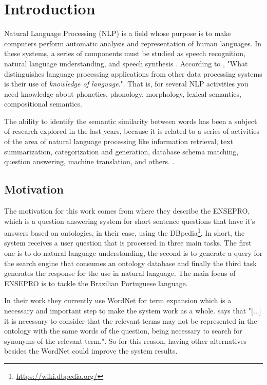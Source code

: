 \section{Introduction}\label{chap:intro}



Natural Language Processing (NLP) is a field whose purpose is to make computers perform automatic analysis and representation of human languages. In these systems, a series of components must be studied as speech recognition, natural language understanding, and speech synthesis \cite{DBLP:journals/corr/abs-1708-02709}.
According to , "What distinguishes language processing applications from other data processing systems is their use of \textit{knowledge of language}.". That is, for several NLP activities you need knowledge about phonetics, phonology, morphology, lexical semantics, compositional semantics.

The ability to identify the semantic similarity between words has been a subject of research explored in the last years, because it is related to a series of activities of the area of natural language processing like information retrieval, text summarization, categorization and generation, database schema matching, question answering, machine translation, and others. \cite{Pawar2018CalculatingTS, gonccalo2018distributional, SRAVANTHI2017SemanticSB, Islam2007ApplicationsOC}. 

\subsection{Motivation} 

The motivation for this work comes from  where they describe the ENSEPRO, which is a question answering system for short sentence questions that have it's answers based on ontologies, in their case, using the DBpedia\footnote{\url{https://wiki.dbpedia.org/}}. In short, the system receives a user question that is processed in three main tasks. The first one is to do natural language understanding, the second is to generate a query for the search engine that consumes an ontology database and finally the third task generates the response for the use in natural language. The main focus of ENSEPRO is to tackle the Brazilian Portuguese language. 

In their work they currently use WordNet for term expansion which is a necessary and important step to make the system work as a whole.  says that 
"[...] it is necessary to consider that the relevant terms may not be represented in the ontology with the same words of the question, being necessary to search for synonyms of the relevant term.". 
So for this reason, having other alternatives besides the WordNet could improve the system results.

